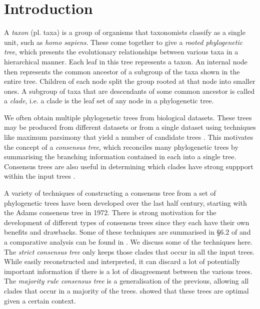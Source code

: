 \documentclass[12pt,a4paper]{article}
\begin{document}
    \listoffigures
    \listoftables
    \newpage

    \section{Introduction}
    \label{sec:introduction}

    A \textit{taxon} (pl. taxa) is a group of organisms that taxonomists classify as a single unit, such as \textit{homo sapiens}. These come together to give a \textit{rooted phylogenetic tree}, which presents the evolutionary relationships between various taxa in a hierarchical manner. Each leaf in this tree represents a taxon. An internal node then represents the common ancestor of a subgroup of the taxa shown in the entire tree. Children of each node split the group rooted at that node into smaller ones. A subgroup of taxa that are descendants of some common ancestor is called a \textit{clade}, i.e. a clade is the leaf set of any node in a phylogenetic tree.

    We often obtain multiple phylogenetic trees from biological datasets. These trees may be produced from different datasets or from a single dataset using techniques like maximum parsimony that yield a number of candidate trees \citep{bryant1997hunting}. This motivates the concept of a \textit{consensus tree}, which reconciles many phylogenetic trees by summarising the branching information contained in each into a single tree. Consensus trees are also useful in determining which clades have strong suppport within the input trees \citep{felsenstein2004inferring}.

    A variety of techniques of constructing a consensus tree from a set of phylogenetic trees have been developed over the last half century, starting with the Adams consensus tree \citep{adams1972consensus} in 1972. There is strong motivation for the development of different types of consensus trees since they each have their own benefits and drawbacks. Some of these techniques are summarised in \S 6.2 of \cite{bryant1997hunting} and a comparative analysis can be found in \cite{bryant2003classification}. We discuss some of the techniques here. The \textit{strict consensus tree} \citep{sokal1981taxonomic} only keeps those clades that occur in all the input trees. While easily reconstructed and interpreted, it can discard a lot of potentially important information if there is a lot of disagreement between the various trees. The \textit{majority rule consensus tree} \citep{margush1981consensusn} is a generalisation of the previous, allowing all clades that occur in a majority of the trees. \cite{holder2008justification} showed that these trees are optimal given a certain context.
\end{document}
